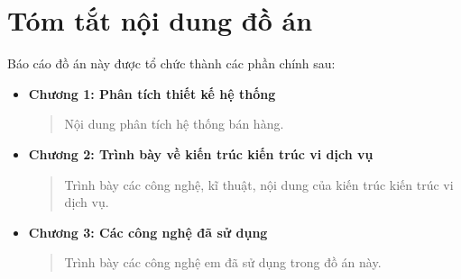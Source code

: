
\section*{Tóm tắt nội dung đồ án}


Báo cáo đồ án này được tổ chức thành các phần chính sau:

\begin{itemize}

\item \textbf{Chương 1: Phân tích thiết kế hệ thống}

\begin{quote}

Nội dung phân tích hệ thống bán hàng.

\end{quote}

\item \textbf{Chương 2: Trình bày về kiến trúc kiến trúc vi dịch vụ}

\begin{quote}

Trình bày các công nghệ, kĩ thuật, nội dung của kiến trúc kiến trúc vi dịch vụ.

\end{quote}

\item \textbf{Chương 3: Các công nghệ đã sử dụng}

\begin{quote}

Trình bày các công nghệ em đã sử dụng trong đồ án này.

\end{quote}

\end{itemize}












